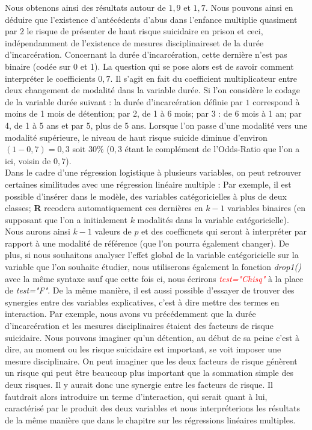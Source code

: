 Nous obtenons ainsi des résultats autour de $1,9$ et $1,7$. Nous pouvons ainsi en déduire que l'existence d'antécédents d'abus dans l'enfance multiplie quasiment par $2$ le risque de présenter de haut risque suicidaire en prison et ceci, indépendamment de l'existence de mesures disciplinaireset de la durée d'incarcération.\newline
Concernant la durée d'incarcération, cette dernière n'est pas binaire (codée sur 0 et 1). La question qui se pose alors est de savoir comment interpréter le coefficients $0,7$. Il s'agit en fait du coefficient multiplicateur entre deux changement de modalité dans la variable durée. \newline
Si l'on considère le codage de la variable durée suivant : la durée d'incarcération définie par $1$ correspond à moins de 1 mois de détention; par 2, de 1 à 6 mois; par 3 : de 6 mois à 1 an; par 4, de 1 à 5 ans et par 5, plus de 5 ans.\newline
Lorsque l'on passe d'une modalité vers une modalité supérieure, le niveau de haut risque suicide diminue d'environ $(1-0,7) = 0,3$ soit $30\%$ ($0,3$ étant le complément de l'Odds-Ratio que l'on a ici, voisin de $0,7$).\newline
\\
Dans le cadre d'une régression logistique à plusieurs variables, on peut retrouver certaines similitudes avec une régression linéaire multiple : Par exemple, il est possible d'insérer dans le modèle, des variables catégoricielles à plus de deux classes; \textbf{R} recodera automatiquement ces dernières en $k-1$ variables binaires (en supposant que l'on a initialement $k$ modalités dans la variable catégoricielle). Nous aurons ainsi $k-1$ valeurs de $p$ et des coefficnets qui seront à interpréter par rapport à une modalité de référence (que l'on pourra également changer).\newline
De plus, si nous souhaitons analyser l'effet global de la variable catégoricielle sur la variable que l'on souhaite étudier, nous utiliserons également la fonction \textit{drop1()} avec la même syntaxe sauf que cette fois ci, nous écrirons \textit{\textcolor{red}{test="Chisq"}} à la place de \textit{test="F"}.\newline
De la même manière, il est aussi possible d'essayer de trouver des synergies entre des variables explicatives, c'est à dire mettre des termes en interaction. Par exemple, nous avons vu précédemment que la durée d'incarcération et les mesures disciplinaires étaient des facteurs de risque suicidaire. Nous pouvons imaginer qu'un détention, au début de sa peine c'est à dire, au moment ou les risque suicidaire est important, se voit imposer une mesure disciplinaire. On peut imaginer que les deux facteurs de risque génèrent un risque qui peut être beaucoup plus important que la sommation simple des deux risques. Il y aurait donc une synergie entre les facteurs de risque. Il fautdrait alors introduire un terme d'interaction, qui serait quant à lui, caractérisé par le produit des deux variables et nous interpréterions les résultats de la même manière que dans le chapitre sur les régressions linéaires multiples.\newline
